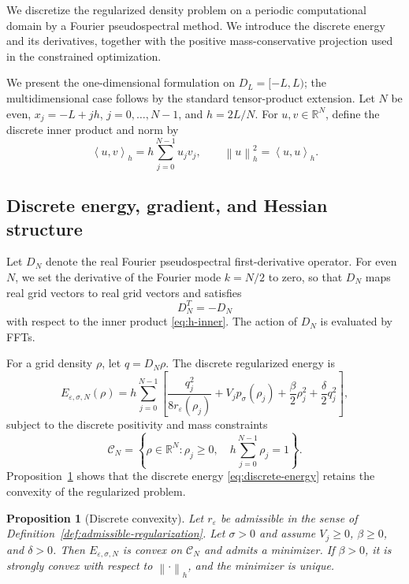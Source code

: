 \documentclass[11pt]{article}
\newcommand{\R}{\mathbb{R}}
\newcommand{\CN}{\mathcal{C}_N}
\newcommand{\eps}{\varepsilon}
\newcommand{\sig}{\sigma}
\newcommand{\inner}[2]{\left\langle #1,#2\right\rangle}
\newcommand{\norm}[1]{\left\|#1\right\|}
\theoremstyle{plain}
\newtheorem{proposition}[theorem]{Proposition}
\theoremstyle{definition}
\numberwithin{equation}{section}
\begin{document}
We discretize the regularized density problem on a periodic
computational domain by a Fourier pseudospectral method. We introduce
the discrete energy and its derivatives, together with the positive
mass-conservative projection used in the constrained optimization.

We present the one-dimensional formulation on $D_L=[-L,L)$; the
multidimensional case follows by the standard tensor-product
extension. Let $N$ be even,
$x_j=-L+jh$, $j=0,\ldots,N-1$, and $h=2L/N$. For
$u,v\in\R^N$, define the discrete inner product and norm by
\begin{equation}
\label{eq:h-inner}
\inner{u}{v}_h
=
h\sum_{j=0}^{N-1}u_jv_j,
\qquad
\norm{u}_h^2=\inner{u}{u}_h.
\end{equation}


\subsection{Discrete energy, gradient, and Hessian structure}

Let $D_N$ denote the real Fourier pseudospectral first-derivative
operator. For even $N$, we set the derivative of the Fourier mode
$k=N/2$ to zero, so that $D_N$ maps real grid vectors to real grid
vectors and satisfies
\begin{equation}
\label{eq:skew-adjoint}
D_N^T=-D_N
\end{equation}
with respect to the inner product \eqref{eq:h-inner}. The action of
$D_N$ is evaluated by FFTs.

For a grid density $\rho$, let $q=D_N\rho$. The discrete regularized
energy is
\begin{equation}
\label{eq:discrete-energy}
E_{\eps,\sig,N}(\rho)
=
h\sum_{j=0}^{N-1}
\left[
\frac{q_j^2}{8r_\eps(\rho_j)}
+V_jp_\sig(\rho_j)
+\frac{\beta}{2}\rho_j^2
+\frac{\delta}{2}q_j^2
\right],
\end{equation}
subject to the discrete positivity and mass constraints
\begin{equation}
\label{eq:discrete-feasible}
\CN
=
\left\{
\rho\in\R^N:
\rho_j\ge0,
\quad
h\sum_{j=0}^{N-1}\rho_j=1
\right\}.
\end{equation}
Proposition~\ref{prop:discrete-convex} shows that the discrete energy
\eqref{eq:discrete-energy} retains the convexity of the regularized
problem.

\begin{proposition}[Discrete convexity]
\label{prop:discrete-convex}
Let $r_\eps$ be admissible in the sense of
Definition~\ref{def:admissible-regularization}. Let $\sig>0$ and assume
$V_j\ge0$, $\beta\ge0$, and $\delta>0$.
Then $E_{\eps,\sig,N}$ is convex on $\CN$ and admits a minimizer.
If $\beta>0$, it is strongly convex with respect to
$\norm{\cdot}_h$, and the minimizer is unique.
\end{proposition}
\end{document}
